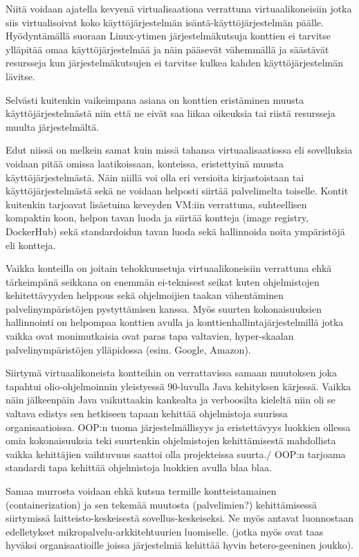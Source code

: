 \documentclass[finnish]{tktltiki2}
\theoremstyle{definition}
\theoremstyle{remark}
\begin{document}
Niitä voidaan ajatella kevyenä virtualisaationa verrattuna virtuaalikoneisiin jotka siis virtualisoivat koko käyttöjärjestelmän isäntä-käyttöjärjestelmän päälle. Hyödyntämällä suoraan Linux-ytimen järjestelmäkutsuja konttien ei tarvitse ylläpitää omaa käyttöjärjestelmää ja näin pääsevät vähemmällä ja säästävät resursseja kun järjestelmäkutsujen ei tarvitse kulkea kahden käyttöjärjestelmän lävitse.

Selvästi kuitenkin vaikeimpana asiana on konttien eristäminen muusta käyttöjärjestelmästä niin että ne eivät saa liikaa oikeuksia tai riistä resursseja muulta järjestelmältä.

Edut niissä on melkein samat kuin missä tahansa virtuaalisaatiossa eli sovelluksia voidaan pitää omissa laatikoissaan, konteissa, eristettyinä muusta käyttöjärjestelmästä. Näin niillä voi olla eri versioita kirjastoistaan tai käyttöjärjestelmästä sekä ne voidaan helposti siirtää palvelimelta toiselle. Kontit kuitenkin tarjoavat lisäetuina keveyden VM:iin verrattuna, suhteellisen kompaktin koon, helpon tavan luoda ja siirtää kontteja (image registry, DockerHub) sekä standardoidun tavan luoda sekä hallinnoida noita ympäristöjä eli kontteja.

Vaikka konteilla on joitain tehokkuusetuja virtuaalikoneisiin verrattuna ehkä tärkeimpänä seikkana on enemmän ei-teknisest seikat kuten ohjelmistojen kehitettävyyden helppous sekä ohjelmoijien taakan vähentäminen palvelinympäristöjen pystyttämisen kanssa. Myös suurten kokonaisuuksien hallinnointi on helpompaa konttien avulla ja konttienhallintajärjestelmillä jotka vaikka ovat monimutkaisia ovat paras tapa valtavien, hyper-skaalan palvelinympäristöjen ylläpidossa (esim. Google, Amazon).

Siirtymä virtuaalikoneista kontteihin on verrattavissa samaan muutoksen joka tapahtui olio-ohjelmoinnin yleistyessä 90-luvulla Java kehityksen kärjessä. Vaikka näin jälkeenpäin Java vaikuttaakin kankealta ja verboosilta kieleltä niin oli se valtava edistys sen hetkiseen tapaan kehittää ohjelmistoja suurissa organisaatioissa. OOP:n tuoma järjestelmällisyys ja eristettävyys luokkien ollessa omia kokonaisuuksia teki suurtenkin ohjelmistojen kehittämisestä mahdollista vaikka kehittäjien vaihtuvuus saattoi olla projekteissa suurta./ OOP:n tarjoama standardi tapa kehittää ohjelmistoja luokkien avulla blaa blaa.

Samaa murrosta voidaan ehkä kutsua termille kontteistamainen (containerization) ja sen tekemää muutosta (palvelimien?) kehittämisessä siirtymissä laitteisto-keskeisestä sovellus-keskeiseksi. Ne myös antavat luonnostaan edelletykset mikropalvelu-arkkitehtuurien luomiselle. (jotka myös ovat taas hyväksi organisaatioille joissa järjestelmiä kehittää hyvin hetero-geeninen joukko).
\end{document}
